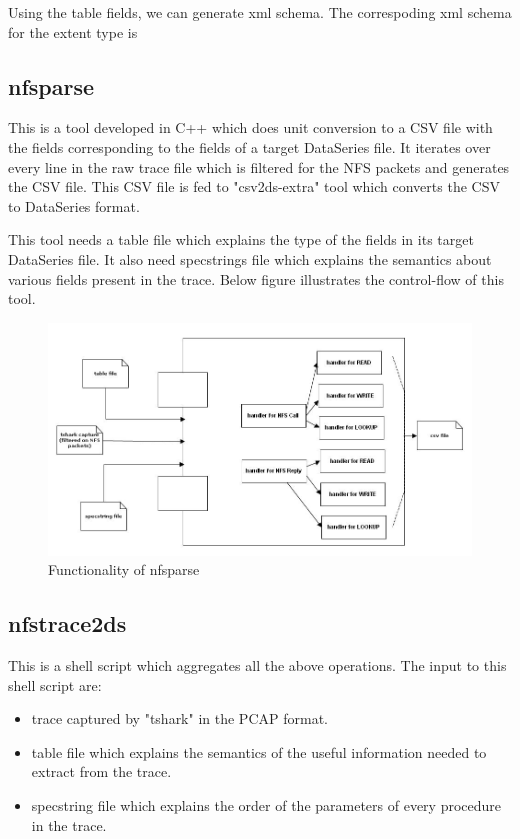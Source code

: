 \documentclass[conference]{IEEEtran}
\begin{document}
Using the table fields, we can generate xml schema. The correspoding xml schema for the extent type is \\

\lstset{breaklines=true}


\subsection{nfsparse}
This is a tool developed in C++ which does unit conversion to a CSV file with the fields corresponding to the fields of a target
DataSeries file. It iterates over every line in the raw trace file which is filtered for the NFS packets and generates the CSV file. This CSV file is fed to "csv2ds-extra" tool which converts the CSV to DataSeries format. 

This tool needs a table file which explains the type of the fields in its target DataSeries file. It also need specstrings file which explains the semantics about various fields present in the trace. Below figure illustrates the control-flow of this tool.\\

\begin{figure}[htb]
\centering
\includegraphics[width=\linewidth]{nfsparse.jpg}
\caption{Functionality of nfsparse}
\label{fig:awesome_image}
\end{figure}

\subsection{nfstrace2ds}
This is a shell script which aggregates all the above operations. The input to this shell script are: 
\begin{itemize}
\item
trace captured by "tshark" in the PCAP format.
\item
table file which explains the semantics of the useful information needed to extract from the trace. 
\item
specstring file which explains the order of the parameters of every procedure in the trace. 
\end{itemize}
\end{document}
